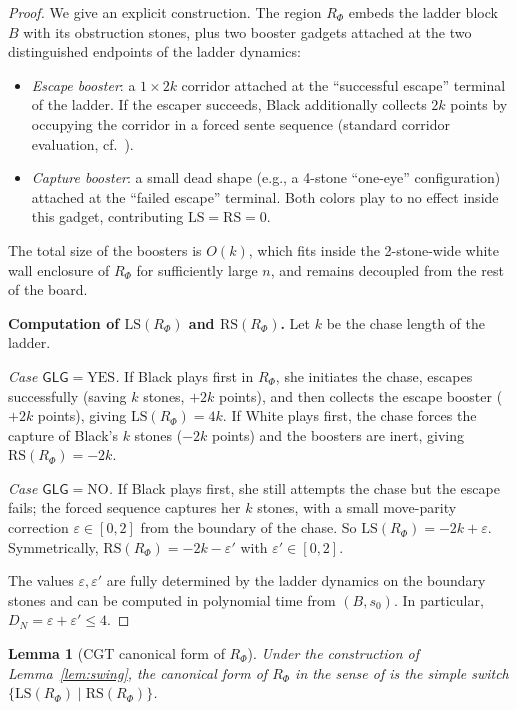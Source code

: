 \documentclass[11pt,a4paper]{amsart}
\newtheorem{lemma}[theorem]{Lemma}
\theoremstyle{definition}
\theoremstyle{remark}
\newcommand{\LS}{\mathrm{LS}}
\newcommand{\RS}{\mathrm{RS}}
\newcommand{\GLG}{\mathsf{GLG}}
\begin{document}
\begin{proof}
We give an explicit construction.
The region $R_\Phi$ embeds the ladder block $B$ with its obstruction
stones, plus two booster gadgets attached at the two distinguished
endpoints of the ladder dynamics:
\begin{itemize}[leftmargin=2em]
\item \emph{Escape booster}: a $1 \times 2k$ corridor attached at the
  ``successful escape'' terminal of the ladder. If the escaper succeeds,
  Black additionally collects $2k$ points by occupying the corridor in a
  forced sente sequence (standard corridor evaluation,
  cf.~\cite[Ch.~3]{BW1994}).
\item \emph{Capture booster}: a small dead shape (e.g., a 4-stone
  ``one-eye'' configuration) attached at the ``failed escape'' terminal.
  Both colors play to no effect inside this gadget, contributing
  $\LS = \RS = 0$.
\end{itemize}
The total size of the boosters is $O(k)$, which fits inside the
2-stone-wide white wall enclosure of $R_\Phi$ for sufficiently large
$n$, and remains decoupled from the rest of the board.

\medskip
\noindent\textbf{Computation of $\LS(R_\Phi)$ and $\RS(R_\Phi)$.}
Let $k$ be the chase length of the ladder.

\emph{Case $\GLG = \mathrm{YES}$.}
If Black plays first in $R_\Phi$, she initiates the chase, escapes
successfully (saving $k$ stones, $+2k$ points), and then collects the
escape booster ($+2k$ points), giving $\LS(R_\Phi) = 4k$.
If White plays first, the chase forces the capture of Black's $k$ stones
($-2k$ points) and the boosters are inert, giving $\RS(R_\Phi) = -2k$.

\emph{Case $\GLG = \mathrm{NO}$.}
If Black plays first, she still attempts the chase but the escape fails;
the forced sequence captures her $k$ stones, with a small move-parity
correction $\varepsilon \in [0, 2]$ from the boundary of the chase. So
$\LS(R_\Phi) = -2k + \varepsilon$. Symmetrically,
$\RS(R_\Phi) = -2k - \varepsilon'$ with $\varepsilon' \in [0, 2]$.

The values $\varepsilon, \varepsilon'$ are fully determined by the
ladder dynamics on the boundary stones and can be computed in polynomial
time from $(B, s_0)$. In particular,
$D_N = \varepsilon + \varepsilon' \leq 4$.
\end{proof}

\begin{lemma}[CGT canonical form of $R_\Phi$]\label{lem:canonical}
Under the construction of Lemma~\ref{lem:swing}, the canonical form of
$R_\Phi$ in the sense of \cite[Ch.~4]{BCG1982} is the simple switch
$\{\LS(R_\Phi) \mid \RS(R_\Phi)\}$.
\end{lemma}
\end{document}
